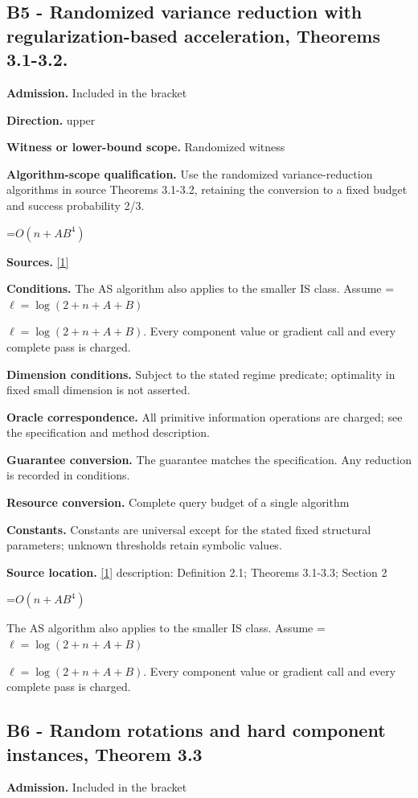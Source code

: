\documentclass[10pt,a4paper]{article}
\newcommand{\AtlasMath}[1]{\par\begingroup\centering\setbox0=\hbox{$\displaystyle #1$}\ifdim\wd0>1.4\linewidth\typeout{ATLAS WIDE FORMULA: \the\wd0}\fi\ifdim\wd0>\linewidth\resizebox{\linewidth}{!}{\box0}\else\box0\fi\par\endgroup}
\newcommand{\AtlasInlineMath}[1]{\begingroup\setbox0=\hbox{$#1$}\ifdim\wd0>.4\linewidth\endgroup\AtlasMath{#1}\else\endgroup$#1$\fi}
\begin{document}
\subsection{B5 - Randomized variance reduction with regularization-based acceleration, Theorems 3.1-3.2.}
\textbf{Admission.} Included in the bracket

\textbf{Direction.} upper

\textbf{Witness or lower-bound scope.} Randomized witness

\textbf{Algorithm-scope qualification.} Use the randomized variance-reduction algorithms in source Theorems 3.1-3.2, retaining the conversion to a fixed budget and success probability 2/3.

\AtlasMath{O(n+AB^4)}
\textbf{Sources.} \href{https://arxiv.org/pdf/2610.16991v2}{[1]}

\textbf{Conditions.} The AS algorithm also applies to the smaller IS class. Assume \AtlasInlineMath{\ell=\log(2+n+A+B)}. Every component value or gradient call and every complete pass is charged.

\textbf{Dimension conditions.} Subject to the stated regime predicate; optimality in fixed small dimension is not asserted.

\textbf{Oracle correspondence.} All primitive information operations are charged; see the specification and method description.

\textbf{Guarantee conversion.} The guarantee matches the specification. Any reduction is recorded in conditions.

\textbf{Resource conversion.} Complete query budget of a single algorithm

\textbf{Constants.} Constants are universal except for the stated fixed structural parameters; unknown thresholds retain symbolic values.

\textbf{Source location.} \href{https://arxiv.org/pdf/2610.16991v2}{[1]} description: Definition 2.1; Theorems 3.1-3.3; Section 2

\AtlasMath{O(n+AB^4)}
The AS algorithm also applies to the smaller IS class. Assume \AtlasInlineMath{\ell=\log(2+n+A+B)}. Every component value or gradient call and every complete pass is charged.

\subsection{B6 - Random rotations and hard component instances, Theorem 3.3}
\textbf{Admission.} Included in the bracket
\end{document}
